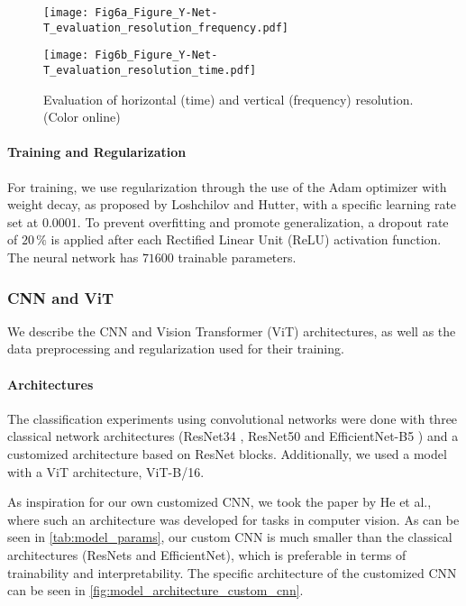 \documentclass[preprint,NumberedRefs]{JASA}
\begin{document}
\begin{figure}[htb]
    \begin{minipage}[t]{0.49\textwidth}
        \texttt{[image: Fig6a\_Figure\_Y-Net-T\_evaluation\_resolution\_frequency.pdf]}
    \end{minipage}
    \begin{minipage}[t]{0.49\textwidth}
            \texttt{[image: Fig6b\_Figure\_Y-Net-T\_evaluation\_resolution\_time.pdf]}
    \end{minipage}
    \caption{Evaluation of horizontal (time) and vertical (frequency) resolution.(Color online)}
\label{fig:Y-Net_res_test}
\end{figure}

\paragraph{Training and Regularization}
\label{sec:Training_and_REgularization_FNN}

For training, we use regularization through the use of the Adam optimizer with weight decay, as proposed by Loshchilov and Hutter, with a specific learning rate set at \(0.0001\). \cite{loshchilov2019decoupled}
To prevent overfitting and promote generalization, a dropout rate of
\(20\,\mathrm{\%} \) is applied after each Rectified Linear Unit (ReLU) activation function.
The neural network has \(71600\) trainable parameters.

\subsubsection{CNN and ViT}
\label{sec:CNN_and_ViT}

We describe the CNN and Vision Transformer (ViT) architectures, as well as the data preprocessing and regularization used for their training.

\paragraph{Architectures}
\label{sec:Architecture_CNN}

The classification experiments using convolutional networks were done with three classical network architectures (ResNet34 \cite{resnets}, ResNet50 \cite{resnets} and EfficientNet-B5 \cite{efficientnetv1}) and a customized architecture based on ResNet blocks.
%
Additionally, we used a model with a ViT architecture, ViT-B/16. \cite{ViT}
%

As inspiration for our own customized CNN, we took the paper by He et al., where such an architecture was developed for tasks in computer vision. \cite{resnets} As can be seen in \autoref{tab:model_params}, our custom CNN is much smaller than the classical architectures (ResNets and EfficientNet), which is preferable in terms of trainability and interpretability. The specific architecture of the customized CNN can be seen in \autoref{fig:model_architecture_custom_cnn}.
\end{document}

